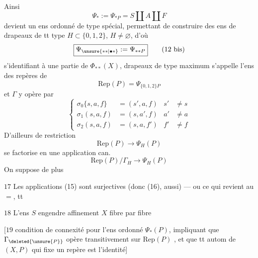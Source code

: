 Ainsi
\[
 \boxed{\Psi_*:=\Psi_{*P}=S\amalg A\amalg F}\tag*{(12)}
\]
devient un ens ordonné de type spécial, permettant de construire des ens de drapeaux de tt type $H\subset\{0,1,2\}$, $H\ne\varnothing$,  d'où
\[
 \boxed{\Psi_{\unsure{**|\bullet *}}:=\Psi_{**P}}\tag*{(12 bis)}
\]
s'identifiant à une partie de $\Phi_{**}(X)$,   drapeaux de type maximum    s'appelle l'ens des repères de   
\[
 \mathrm{Rep}(P)=\Psi_{\{0,1,2\}P}\tag*{(13)}
\]
et $\Gamma$ y opère par
\[
 \left\{\begin{aligned}
 \sigma_0\{s,a,f\}&=(s',a,f)&s'&\ne s\\
 \sigma_1(s,a,f)&=(s,a',f)&a'&\ne a\\
 \sigma_2(s,a,f)&=(s,a,f')&f'&\ne f
 \end{aligned}\right.\tag*{(14)}
\]
 D'ailleurs   de restriction
\[
 \mathrm{Rep}(P)\longrightarrow\Psi_H(P)\tag*{(15)}
\]
se factorise en une application can.
\[
 \mathrm{Rep}(P)/\Gamma_H\longrightarrow\Psi_H(P)\tag*{(16)}
\]
 On suppose de plus

$\boxed{17}$ Les applications (15) sont surjectives (donc (16), aussi) --- ou ce qui revient au $=$,  tt     

$\boxed{18}$ L'ens  $S$ engendre affinement $X$ fibre par fibre

[$\boxed{19}$ condition de connexité pour l'ens ordonné $\Psi_*(P)$, impliquant que $\Gamma_{\deleted{\unsure{P}}}$ opère transitivement sur $\mathrm{Rep}(P)$ , et que tt autom de $(X,P)$  qui fixe un repère est l'identité]

